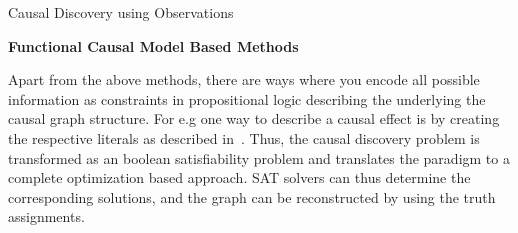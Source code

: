 \documentclass[10pt]{article}
\begin{document}
\begin{psection}[3]{Causal Discovery using Observations}
\begin{psubsection}{\textbf{Functional Causal Model Based Methods}}
    \end{psubsection}
    
    Apart from the above methods, there are ways where you encode all possible
    information as constraints in propositional logic describing the underlying the
    causal graph structure. For e.g one way to describe a causal effect is by creating
    the respective literals as described in~\cite{eberhardt2017introduction}. Thus, the
    causal discovery problem is transformed as an boolean satisfiability problem and
    translates the paradigm to a complete optimization based approach. SAT solvers can
    thus determine the corresponding solutions, and the graph can be reconstructed by
    using the truth assignments. 

\end{psection}
\end{document}
